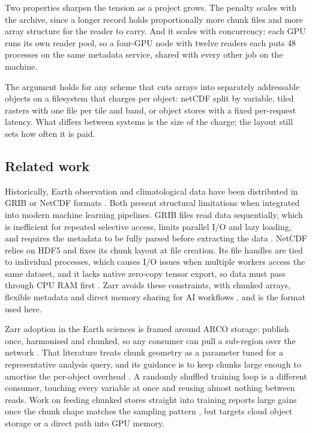 \documentclass[gmd, manuscript]{copernicus}
\begin{document}
Two properties sharpen the tension as a project grows. The penalty scales with the archive,
since a longer record holds proportionally more chunk files and more array structure for the
reader to carry. And it scales with concurrency: each GPU runs its own reader pool, so a
four-GPU node with twelve readers each puts 48 processes on the same metadata service, shared
with every other job on the machine.

The argument holds for any scheme that cuts arrays into separately addressable objects on a
filesystem that charges per object: netCDF split by variable, tiled rasters with one file per
tile and band, or object stores with a fixed per-request latency. What differs between systems
is the size of the charge; the layout still sets how often it is paid.

\subsection{Related work}
\label{sec:related}

Historically, Earth observation and climatological data have been distributed in GRIB or
NetCDF formats \citep{Gowan2022, Kuluke2021}. Both present structural limitations when
integrated into modern machine learning pipelines. GRIB files read data sequentially, which is
inefficient for repeated selective access, limits parallel I/O and lazy loading, and requires
the metadata to be fully parsed before extracting the data \citep{Gowan2022, Glahn2003}. NetCDF
relies on HDF5 and fixes its chunk layout at file creation. Its file handles are tied to
individual processes, which causes I/O issues when multiple workers access the same dataset,
and it lacks native zero-copy tensor export, so data must pass through CPU RAM first
\citep{Huang2023, Russell2006}. Zarr avoids these constraints, with chunked arrays, flexible
metadata and direct memory sharing for AI workflows \citep{Gowan2022, newman2024zarr}, and is
the format used here.

Zarr adoption in the Earth sciences is framed around ARCO storage: publish once, harmonised
and chunked, so any consumer can pull a sub-region over the network \citep{abernathey2021}.
That literature treats chunk geometry as a parameter tuned for a representative analysis
query, and its guidance is to keep chunks large enough to amortise the per-object overhead
\citep{dask_chunks}. A randomly shuffled training loop is a different consumer, touching every
variable at once and reusing almost nothing between reads. Work on feeding chunked stores
straight into training reports large gains once the chunk shape matches the sampling pattern
\citep{earthmover_dataloader, xarray_gpu_pipeline}, but targets cloud object storage or a
direct path into GPU memory.
\end{document}
